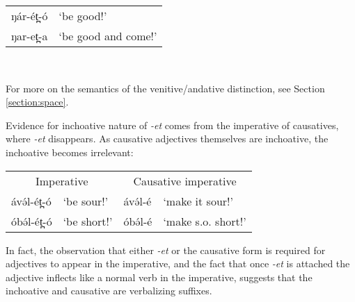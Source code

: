 \ea  \begin{tabular}[t]{ll}
ŋár-ét̪-ó	& 	‘be good!’\\
ŋar-et̪-a	&	‘be good and come!’ \\
\end{tabular} \\ 
\z

For more on the semantics of the venitive/andative distinction, see Section \ref{section:space}.

Evidence for inchoative nature of \textit{-et} comes from the imperative of causatives, where \textit{-et} disappears. As causative adjectives themselves are inchoative, the inchoative becomes irrelevant:


\ea	\begin{tabular}[t]{llll}
	\multicolumn{2}{c}{Imperative} & \multicolumn{2}{c}{Causative imperative} \\
ávə́l-ét̪-ó	& ‘be sour!’	& ávə́l-é	& ‘make it sour!’\\
óbə́l-ét̪-ó	& ‘be short!’	&  óbə́l-é	& ‘make s.o. short!’\\
\end{tabular}
\z 

In fact, the observation that either \textit{-et} or the causative form is required for adjectives to appear in the imperative, and the fact that once \textit{-et} is attached the adjective inflects like a normal verb in the imperative, suggests that the inchoative and causative are verbalizing suffixes. %





	 

